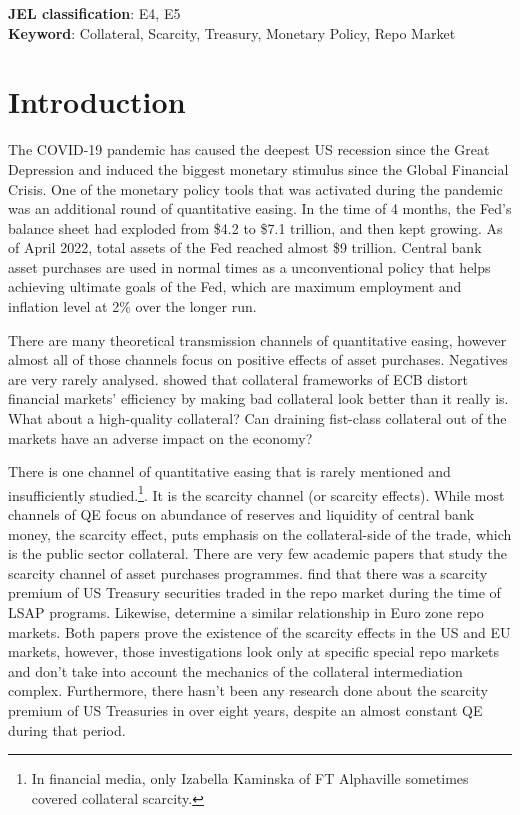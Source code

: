 \documentclass[11pt,a4paper,english,oneside]{article}
\begin{document}
\begin{flushleft}
  \textbf{JEL classification}: E4, E5\\
  \textbf{Keyword}: Collateral, Scarcity, Treasury, Monetary Policy, Repo Market
\end{flushleft}

\section{Introduction} \label{sec:introduction} %

The COVID-19 pandemic has caused the deepest US recession since the Great Depression and induced the biggest monetary stimulus since the Global Financial Crisis. One of the monetary policy tools that was activated during the pandemic was an additional round of quantitative easing. In the time of 4 months, the Fed's balance sheet had exploded from \$4.2 to \$7.1 trillion, and then kept growing. As of April 2022, total assets of the Fed reached almost \$9 trillion. Central bank asset purchases are used in normal times as a unconventional policy that helps achieving ultimate goals of the Fed, which are maximum employment and inflation level at 2\% over the longer run.


There are many theoretical transmission channels of quantitative easing, however almost all of those channels focus on positive effects of asset purchases. Negatives are very rarely analysed. \citet{nyborg2015} showed that collateral frameworks of ECB distort financial markets' efficiency by making bad collateral look better than it really is. What about a high-quality collateral? Can draining fist-class collateral out of the markets have an adverse impact on the economy?

There is one channel of quantitative easing that is rarely mentioned and insufficiently studied.\footnote{In financial media, only Izabella Kaminska of FT Alphaville sometimes covered collateral scarcity.}. It is the scarcity channel (or scarcity effects). While most channels of QE focus on abundance of reserves and liquidity of central bank money, the scarcity effect, puts emphasis on the collateral-side of the trade, which is the public sector collateral. There are very few academic papers that study the scarcity channel of asset purchases programmes. \citet{damico2014} find that there was a scarcity premium of US Treasury securities traded in the repo market during the time of LSAP programs. Likewise, \citet{arrata2018} determine a similar relationship in Euro zone repo markets. Both papers prove the existence of the scarcity effects in the US and EU markets, however, those investigations look only at specific special repo markets and don't take into account the mechanics of the collateral intermediation complex. Furthermore, there hasn't been any research done about the scarcity premium of US Treasuries in over eight years, despite an almost constant QE during that period.
\end{document}
